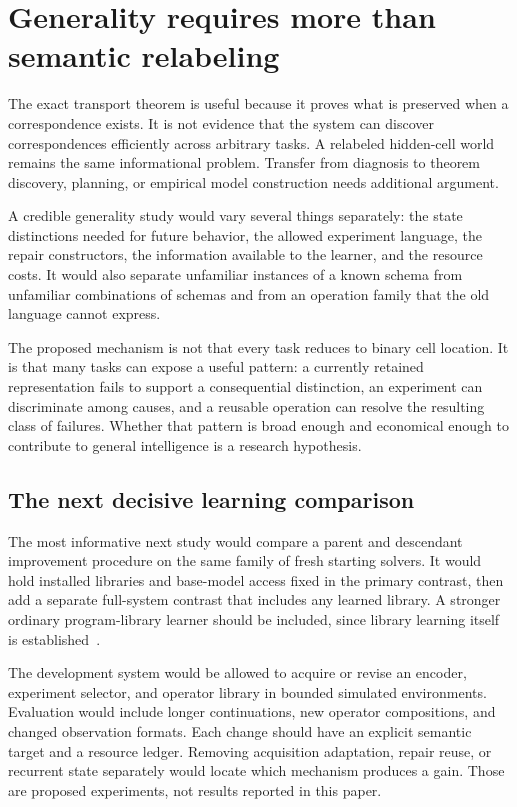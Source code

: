 \section{Generality requires more than semantic relabeling}\label{SII:sec:generality}
The exact transport theorem is useful because it proves what is preserved when a correspondence exists. It is not evidence that the system can discover correspondences efficiently across arbitrary tasks. A relabeled hidden-cell world remains the same informational problem. Transfer from diagnosis to theorem discovery, planning, or empirical model construction needs additional argument.

A credible generality study would vary several things separately: the state distinctions needed for future behavior, the allowed experiment language, the repair constructors, the information available to the learner, and the resource costs. It would also separate unfamiliar instances of a known schema from unfamiliar combinations of schemas and from an operation family that the old language cannot express.

The proposed mechanism is not that every task reduces to binary cell location. It is that many tasks can expose a useful pattern: a currently retained representation fails to support a consequential distinction, an experiment can discriminate among causes, and a reusable operation can resolve the resulting class of failures. Whether that pattern is broad enough and economical enough to contribute to general intelligence is a research hypothesis.

\subsection{The next decisive learning comparison}
The most informative next study would compare a parent and descendant improvement procedure on the same family of fresh starting solvers. It would hold installed libraries and base-model access fixed in the primary contrast, then add a separate full-system contrast that includes any learned library. A stronger ordinary program-library learner should be included, since library learning itself is established~\cite{SII:dreamcoder}.

The development system would be allowed to acquire or revise an encoder, experiment selector, and operator library in bounded simulated environments. Evaluation would include longer continuations, new operator compositions, and changed observation formats. Each change should have an explicit semantic target and a resource ledger. Removing acquisition adaptation, repair reuse, or recurrent state separately would locate which mechanism produces a gain. Those are proposed experiments, not results reported in this paper.

